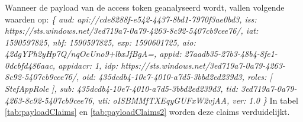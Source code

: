\subsubsection{}
Wanneer de payload van de access token geanalyseerd wordt, vallen volgende waarden op:
\emph{
	\{\newline
		aud: api://cde8288f-e542-4437-8bd1-7970f3ae0bd3,\newline
		iss: https://sts.windows.net/3ed719a7-0a79-4263-8c92-5407cb9cee76/,\newline
		iat: 1590597825,\newline
		nbf: 1590597825,\newline
		exp: 1590601725,\newline
		aio: 42dgYPh2yHp7Q/nqOeUno9+lbxJfBgA=,\newline
		appid: 27aadb35-27b3-48b4-8fe1-0dcbfd486aac,\newline
		appidacr: 1,\newline
		idp: https://sts.windows.net/3ed719a7-0a79-4263-8c92-5407cb9cee76/,\newline
		oid: 435dcdb4-10e7-4010-a7d5-3bbd2ed239d3,\newline
		roles: [\newline
		StefAppRole\newline
		],\newline
		sub: 435dcdb4-10e7-4010-a7d5-3bbd2ed239d3,\newline
		tid: 3ed719a7-0a79-4263-8c92-5407cb9cee76,\newline
		uti: oISBMMfTXEqyGUFxW2vjAA,\newline
		ver: 1.0\newline
	\}\newline
}
In tabel \ref{tab:payloadClaims} en \ref{tab:payloadClaims2} worden deze claims verduidelijkt.\newpage
